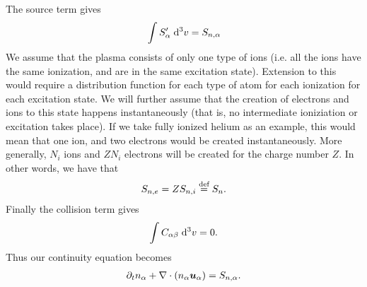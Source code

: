 %
The source term gives
%
\begin{align*}
    \int {S'_{\alpha}} \; \text{d} {^3v} = S_{n,\alpha}
\end{align*}
%
We assume that the plasma consists of only one type of ions (i.e. all the ions have the same ionization, and are in the same excitation state).
Extension to this would require a distribution function for each type of atom for each ionization for each excitation state.
We will further assume that the creation of electrons and ions to this state happens instantaneously (that is, no intermediate ioniziation or excitation takes place).
If we take fully ionized helium as an example, this would mean that one ion, and two electrons would be created instantaneously.
More generally, $N_i$ ions and $ZN_i$ electrons will be created for the charge number $Z$.
In other words, we have that
%
\begin{align}
    S_{n,e}=ZS_{n,i}\overset{\text{def}}{=} S_n.
    \label{eq:kinSource}
\end{align}
%
Finally the collision term gives
%
\begin{align*}
    \int {C_{\alpha\beta}} \; \text{d} {^3v} = 0.
\end{align*}
%
Thus our continuity equation becomes
%
\begin{align}
    \partial_t n_\alpha + \nabla\cdot\left(n_\alpha \boldsymbol{u}_\alpha\right) = S_{n,\alpha} \label{kin:cont}.
\end{align}

